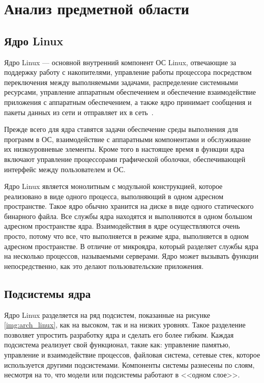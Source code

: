\section{Анализ предметной области}


\subsection{Ядро Linux}
Ядро Linux --- основной внутренний компонент ОС Linux, отвечающие за поддержку работу с накопителями, управление работы процессора посредством переключения между выполняемыми задачами, распределение системными ресурсами, управление аппаратным обеспечением и обеспечение взаимодействие приложения с аппаратным обеспечением, а также ядро принимает сообщения и пакеты данных из сети и отправляет их в сеть~\cite{kernel_linux_robert}.

Прежде всего для ядра ставятся задачи обеспечение среды выполнения для программ в ОС, взаимодействие с аппаратными компонентами и обслуживание их низкоуровневые элементы.
Кроме того в настоящее время в функции ядра включают управление процессорами графической оболочки, обеспечивающей интерфейс между пользователем и ОС.

Ядро Linux является монолитным с модульной конструкцией, которое реализовано в виде одного процесса, выполняющий в одном адресном пространстве.
Такое ядро обычно хранится на диске в виде одного статического бинарного файла.
Все службы ядра находятся и выполняются в одном большом адресном пространстве ядра.
Взаимодействия в ядре осуществляются очень просто, потому что все, что выполняется в режиме ядра, выполняется в одном адресном пространстве.
В отличие от микроядра, который разделяет службы ядра на несколько процессов, называемыми серверами.
Ядро может вызывать функции непосредственно, как это делают пользовательские приложения.

\subsection{Подсистемы ядра}
Ядро Linux разделяется на ряд подсистем, показанные на рисунке \ref{img:arch_linux}, как на высоком, так и на низких уровнях. Такое разделение позволяет упростить разработку ядра и сделать его более гибким.
Каждая подсистема реализует свой функционал, такие как: управление памятью, управление и взаимодействие процессов, файловая система, сетевые стек, которое используется другими подсистемами. Компоненты системы разнесены по слоям, несмотря на то, что модели или подсистемы работают в <<одном слое>>.

